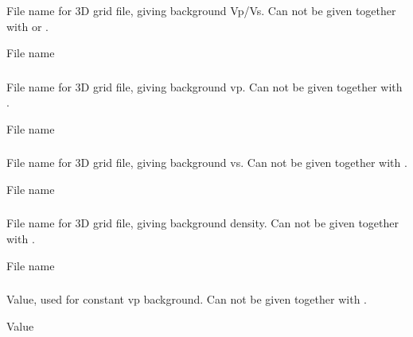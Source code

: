 \subsubsection{}
 \slist
   \item \Description File name for 3D grid file, giving background
   Vp/Vs. Can not be given together with  or .
   \item \Argument File name
   \item \Default
 \elist

\subsubsection{}
 \slist
   \item \Description File name for 3D grid file, giving background vp. Can not be given together with .
   \item \Argument File name
   \item \Default
 \elist

\subsubsection{}
 \slist
   \item \Description File name for 3D grid file, giving background vs. Can not be given together with .
   \item \Argument File name
   \item \Default
 \elist

\subsubsection{}
 \slist
   \item \Description File name for 3D grid file, giving background density. Can not be given together with .
   \item \Argument File name
   \item \Default
 \elist

\subsubsection{}
 \slist
   \item \Description Value, used for constant vp background. Can not be given together with .
   \item \Argument Value
   \item \Default
 \elist

